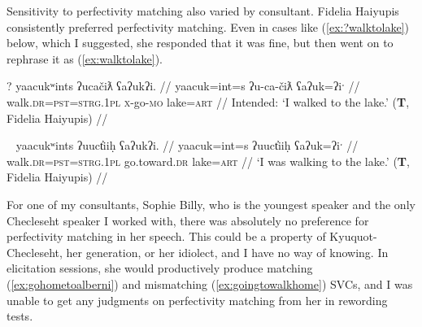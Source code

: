 \begin{comment}
(\ref{ex:drivehome}) and (\ref{ex:*drivehome}) show the same pattern and were elicited in the same way	. In (\ref{ex:drivehome}), the first verb \textit{ƛiḥaa} is in the continuative aspect, which is imperfective, and the second verb \textit{waałšiƛ} is in graduative, which is also imperfective. In (\ref{ex:*drivehome}), the same two verb roots are used, but instead of imperfective, graduative \textit{waałšiƛ}, there is momentaneous, perfective \textit{wałšiƛ}. This aspectual mismatch causes (\ref{ex:*drivehome}) to be ungrammatical.

\ex \label{ex:drivehome}
\begingl
\glpreamble ƛiḥaamitniš siy̓a łuučm̓uupukqs waałšiƛ. //
\gla ƛiḥ-(y)aˑ=(m)it=niˑš siy̓a łuučm̓uup=uk=qs wał-šiƛ-LS //
\glb drive-\textsc{cv}=\textsc{pst}=\textsc{strg.1pl} \textsc{1sg} sister=\textsc{poss}=\textsc{defn.1sg} go.home-\textsc{mo}-\textsc{gr} //
\glft `We were driving home in the car.' (\textbf{C}, \textit{tupaat} Julia Lucas) //
\endgl
\xe

\ex~ \label{ex:*drivehome}
\begingl
\glpreamble *wałšiƛw̓it̓asniš ƛiḥaa. //
\gla wał-šiƛ-w̓it̓as=niˑš ƛiḥ-(y)aˑ //
\glb go.home-\textsc{mo}-going.to=\textsc{strg.1pl} drive-\textsc{cv} //
\glft Intended: `We will drive home.' (\textbf{C}, \textit{tupaat} Julia Lucas) //
\endgl
\xe
\end{comment}

Sensitivity to perfectivity matching also varied by consultant. Fidelia Haiyupis consistently preferred perfectivity matching. Even in cases like (\ref{ex:?walktolake}) below, which I suggested, she responded that it was fine, but then went on to rephrase it as (\ref{ex:walktolake}).

\ex \label{ex:?walktolake}
\begingl
\glpreamble ? yaacukʷints ʔucačiƛ ʕaʔukʔi. //
\gla yaacuk=int=s ʔu-ca-čiƛ ʕaʔuk=ʔiˑ //
\glb walk.\textsc{dr}=\textsc{pst}=\textsc{strg.1pl} \textsc{x}-go-\textsc{mo} lake=\textsc{art} //
\glft Intended: `I walked to the lake.' (\textbf{T}, Fidelia Haiyupis) //
\endgl
\xe

\ex~ \label{ex:walktolake}
\begingl
\glpreamble yaacukʷints ʔuuct̓iiḥ ʕaʔukʔi. //
\gla yaacuk=int=s ʔuuct̓iiḥ ʕaʔuk=ʔiˑ //
\glb walk.\textsc{dr}=\textsc{pst}=\textsc{strg.1pl} go.toward.\textsc{dr} lake=\textsc{art} //
\glft `I was walking to the lake.' (\textbf{T}, Fidelia Haiyupis) //
\endgl
\xe

For one of my consultants, Sophie Billy, who is the youngest speaker and the only Checleseht speaker I worked with, there was absolutely no preference for perfectivity matching in her speech. This could be a property of Kyuquot-Checleseht, her generation, or her idiolect, and I have no way of knowing. In elicitation sessions, she would productively produce matching (\ref{ex:gohometoalberni}) and mismatching (\ref{ex:goingtowalkhome}) SVCs, and I was unable to get any judgments on perfectivity matching from her in rewording tests.


